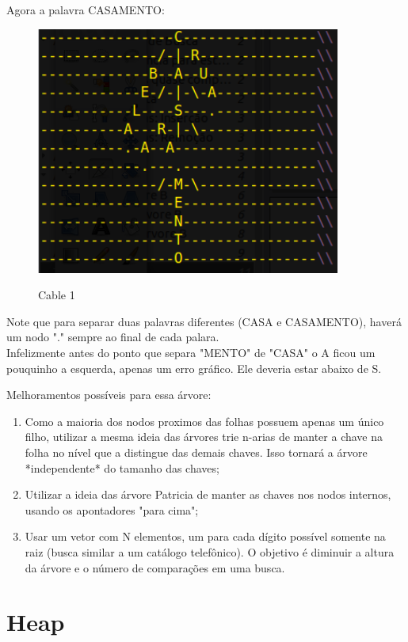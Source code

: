 \documentclass{article}
\begin{document}
Agora a palavra CASAMENTO:\\
\begin{figure}[h]
    \center
    \includegraphics[width=10cm]{imagens/ternaria5.png}
    \label{cable}
    \caption{Cable 1}
\end{figure}

Note que para separar duas palavras diferentes (CASA e CASAMENTO), haverá um nodo "." sempre ao
final de cada palara.\\Infelizmente antes do ponto que separa "MENTO" de "CASA" o A ficou um
pouquinho a esquerda, apenas um erro gráfico. Ele deveria estar abaixo de S.

Melhoramentos possíveis para essa árvore:

\begin{enumerate}
   \item Como a maioria dos nodos proximos das folhas possuem apenas um único filho, utilizar a
mesma ideia das árvores trie n-arias de manter a chave na folha no nível que a distingue das demais
chaves. Isso tornará a árvore *independente* do tamanho das chaves;
   \item Utilizar a ideia das árvore Patricia de manter as chaves nos nodos internos, usando os
apontadores "para cima";
   \item Usar um vetor com N elementos, um para cada dígito possível somente na raiz (busca similar
a um catálogo telefônico).  O objetivo é diminuir a altura da árvore e o número de comparações em uma busca.
\end{enumerate}

\newpage

\section{Heap}
\end{document}
